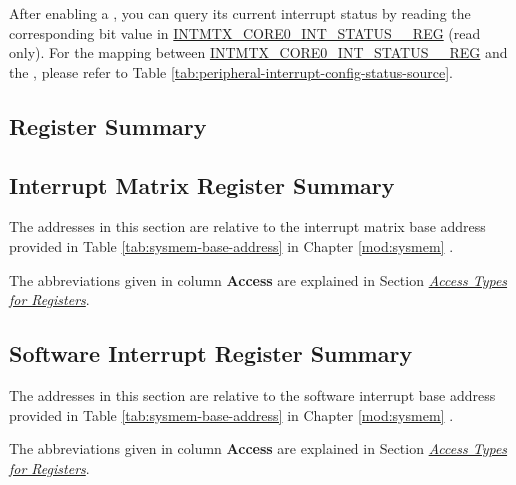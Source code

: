 \documentclass[main\_\_EN.tex]{subfiles}
\begin{document}
After enabling a , you can query its current interrupt status by reading the corresponding bit value in \hyperref[regdesc:INTMTXCORE0INTSTATUS0REG]{INTMTX\_CORE0\_INT\_STATUS\_\_REG} (read only). For the mapping between \hyperref[regdesc:INTMTXCORE0INTSTATUS0REG]{INTMTX\_CORE0\_INT\_STATUS\_\_REG} and the , please refer to Table \ref{tab:peripheral-interrupt-config-status-source}.





\newpage
\hypertarget{intmtrx-reg-summ}{}
\begin{landscape}
\section{Register Summary}


\subsection{Interrupt Matrix Register Summary}
\label{sec:intmtrx-reg-summ}

The addresses in this section are relative to the interrupt matrix base address provided in Table \ref{tab:sysmem-base-address} in Chapter \ref{mod:sysmem} \textit{}.

The abbreviations given in column \textbf{Access} are explained in Section \hyperref[glossary-access-types]{\textit{Access Types for Registers}}.




\subsection{Software Interrupt Register Summary}
\label{sec:intpri-reg-summ}
The addresses in this section are relative to the software interrupt base address provided in Table \ref{tab:sysmem-base-address} in Chapter \ref{mod:sysmem} \textit{}.

The abbreviations given in column \textbf{Access} are explained in Section \hyperref[glossary-access-types]{\textit{Access Types for Registers}}.



\end{landscape}
\end{document}
